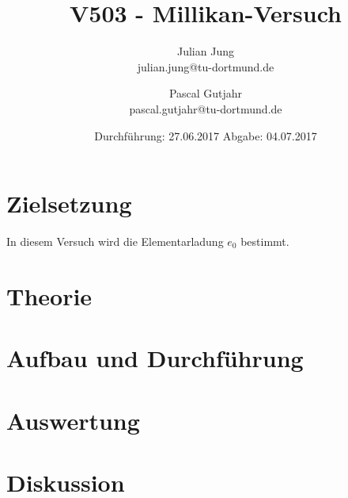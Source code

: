 

\title{V503 - Millikan-Versuch}
\author{Julian Jung \\ julian.jung@tu-dortmund.de
  \and Pascal Gutjahr \\ pascal.gutjahr@tu-dortmund.de}
  \date{Durchführung: 27.06.2017
  \hspace{3em}
  Abgabe: 04.07.2017}
  
\maketitle
\newpage
\tableofcontents
\newpage
\section{Zielsetzung}
In diesem Versuch wird die Elementarladung $e_0$ bestimmt.
\section{Theorie}
 
\section{Aufbau und Durchführung}
 
\section{Auswertung}
 
\section{Diskussion}

\printbibliography

